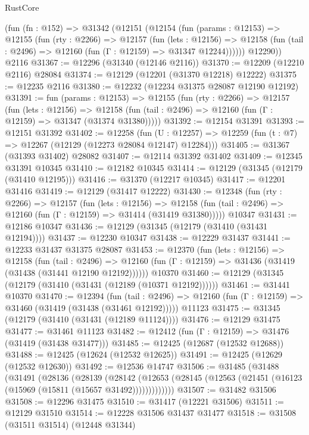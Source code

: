 \begin{lexlean}{RustCore}
\begin{coremodule}
    (fun (fn : @152) =>
    @31342
      (@12151
        (@12154
          (fun (params : @12153) =>
          @12155
            (fun (rty : @2266) =>
            @12157
              (fun (lets : @12156) =>
              @12158 (fun (tail : @2496) => @12160 (fun (Γ : @12159) => @31347 @12244))))))
        @12290))
    @2116
@31367 := @12296 (@31340 (@12146 @2116))
@31370 := @12209 (@12210 @2116) @28084
@31374 := @12129 (@12201 (@31370 @12218) @12222)
@31375 := @12235 @2116
@31380 := @12232 (@12234 @31375 @28087 @12190 @12192)
@31391 := fun (params : @12153) =>
  @12155
    (fun (rty : @2266) =>
    @12157
      (fun (lets : @12156) =>
      @12158 (fun (tail : @2496) => @12160 (fun (Γ : @12159) => @31347 (@31374 @31380)))))
@31392 := @12154 @31391
@31393 := @12151 @31392
@31402 := @12258
    (fun (U : @12257) => @12259 (fun (t : @7) => @12267 (@12129 (@12273 @28084 @12147) @12284)))
@31405 := @31367 (@31393 @31402) @28082
@31407 := @12114 @31392 @31402
@31409 := @12345 @31391 @10345
@31410 := @12182 @10345
@31414 := @12129 (@31345 (@12179 (@31410 @12195)))
@31416 := @31370 (@12217 @10345)
@31417 := @12201 @31416
@31419 := @12129 (@31417 @12222)
@31430 := @12348
    (fun (rty : @2266) =>
    @12157
      (fun (lets : @12156) =>
      @12158 (fun (tail : @2496) => @12160 (fun (Γ : @12159) => @31414 (@31419 @31380)))))
    @10347
@31431 := @12186 @10347
@31436 := @12129 (@31345 (@12179 (@31410 (@31431 @12194))))
@31437 := @12230 @10347
@31438 := @12229 @31437
@31441 := @12233 @31437 @31375 @28087
@31453 := @12370
    (fun (lets : @12156) =>
    @12158
      (fun (tail : @2496) =>
      @12160 (fun (Γ : @12159) => @31436 (@31419 (@31438 (@31441 @12190 @12192))))))
    @10370
@31460 := @12129 (@31345 (@12179 (@31410 (@31431 (@12189 (@10371 @12192))))))
@31461 := @31441 @10370
@31470 := @12394
    (fun (tail : @2496) => @12160 (fun (Γ : @12159) => @31460 (@31419 (@31438 (@31461 @12192)))))
    @11123
@31475 := @31345 (@12179 (@31410 (@31431 (@12189 @11124))))
@31476 := @12129 @31475
@31477 := @31461 @11123
@31482 := @12412 (fun (Γ : @12159) => @31476 (@31419 (@31438 @31477)))
@31485 := @12425 (@12687 (@12532 @12688))
@31488 := @12425 (@12624 (@12532 @12625))
@31491 := @12425 (@12629 (@12532 @12630))
@31492 := @12536 @14747
@31506 := @31485
    (@31488
      (@31491
        (@28136
          (@28139
            (@28142
              (@12653 (@28145 (@12563 (@21451 (@16123 (@15969 (@15811 (@15657 @31492)))))))))))))
@31507 := @31482 @31506
@31508 := @12296 @31475
@31510 := @31417 (@12221 @31506)
@31511 := @12129 @31510
@31514 := @12228 @31506 @31437 @31477
@31518 := @31508 (@31511 @31514) (@12448 @31344)

\end{coremodule}
\end{lexlean}
